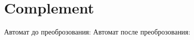 \section{Complement}
\begin{frame}{}
	Автомат до преоброзования:
	Автомат после преоброзования:
\end{frame}
